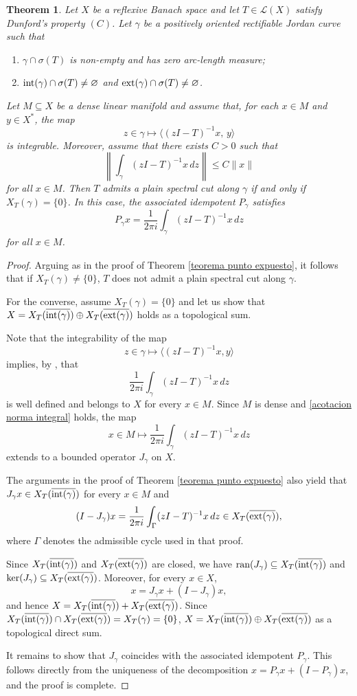 \documentclass[11pt]{amsart}
\newtheorem{theorem}{Theorem}[section]
\theoremstyle{definition}
\theoremstyle{remark}
\numberwithin{equation}{section}
\newcommand{\ran}{\textnormal{ran}}
\newcommand{\pe}[1]{\langle#1\rangle}
\newcommand{\Xint}{X_T(\overline{\inte(\gamma)})}
\newcommand{\Xext}{X_T(\overline{\exte(\gamma)})}
\newcommand{\inte}{\textnormal{int}}
\newcommand{\exte}{\textnormal{ext}}
\begin{document}
\begin{theorem}\label{teorema densidad punto expuesto}
Let $X$ be a reflexive Banach space and let $T\in \mathcal{L}(X)$ satisfy Dunford's property $(C)$. Let $\gamma$ be a positively oriented rectifiable Jordan curve such that
\begin{enumerate}
\item[(i)] $\gamma \cap \sigma(T)$ is non-empty and has zero arc-length measure;
\item[(ii)] $\inte(\gamma)\cap\sigma(T)\neq\varnothing$ and $\exte(\gamma)\cap\sigma(T)\neq\varnothing$.
\end{enumerate}
Let $M\subseteq X$ be a dense linear manifold and assume that, for each
$x\in M$ and $y\in X^*$, the map
$$
z\in \gamma \longmapsto \langle (zI-T)^{-1}x,\,y\rangle
$$
is integrable. Moreover, assume that there exists $C>0$ such that
\begin{equation}\label{acotacion norma integral}
\left\|\int_\gamma (zI-T)^{-1}x\,dz\right\|\le C\|x\|
\end{equation}
for all $x\in M$. Then $T$ admits a plain spectral cut along $\gamma$ if and only if
$X_T(\gamma)=\{0\}$. In this case, the associated idempotent $P_\gamma$
satisfies
$$
P_\gamma x=\frac{1}{2\pi i}\int_\gamma (zI-T)^{-1}x\,dz
$$
for all $x\in M$.
\end{theorem}



\begin{proof}
Arguing as in the proof of Theorem \ref{teorema punto expuesto}, it follows that if $X_T(\gamma)\neq\{0\}$, $T$ does not admit a plain spectral cut along $\gamma$.

For the converse, assume $X_T(\gamma) = \{0\}$ and let us show that $X=\Xint\oplus\Xext$ holds as a topological sum.

Note that the integrability of the map
$$
z\in \gamma \longmapsto \pe{(z I-T)^{-1}x,y}
$$
implies, by \cite[Theorem 11.55]{AB}, that
$$
\frac{1}{2\pi i}\int_\gamma (zI-T)^{-1}x\,dz
$$
is well defined and belongs to $X$ for every $x\in M$. Since $M$ is dense and
\eqref{acotacion norma integral} holds, the map
$$
x\in M \longmapsto \frac{1}{2\pi i}\int_\gamma (zI-T)^{-1}x\,dz
$$
extends to a bounded operator $J_\gamma$ on $X$.

The arguments in the proof of Theorem \ref{teorema punto expuesto} also yield that
$J_\gamma x\in \Xint$ for every $x\in M$ and
$$
(I-J_\gamma)x=\frac{1}{2\pi i}\int_\Gamma (zI-T)^{-1}x\,dz \in \Xext,
$$
where $\Gamma$ denotes the admissible cycle used in that proof.

Since $\Xint$ and $\Xext$ are closed, we have
$\ran(J_\gamma)\subseteq \Xint$ and $\ker(J_\gamma)\subseteq \Xext$.
Moreover, for every $x\in X$,
$$
x = J_\gamma x + (I-J_\gamma)x,
$$
and hence $X=\Xint+\Xext$. Since $\Xint\cap\Xext = X_T(\gamma)=\{0\}$, $ X=\Xint\oplus \Xext $ as a topological direct sum.

It remains to show that $J_\gamma$ coincides with the associated idempotent $P_\gamma$.
This follows directly from the uniqueness of the decomposition
$x=P_\gamma x+(I-P_\gamma)x$, and the proof is complete.
\end{proof}
\end{document}

